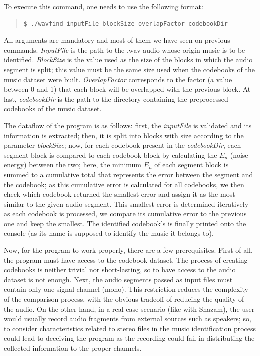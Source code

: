 \documentclass[12pt]{article}
\begin{document}
To execute this command, one needs to use the following format:

\begingroup
\addtolength\leftmargini{-0.4in}
\begin{quote}
\begin{verbatim}
$ ./wavfind inputFile blockSize overlapFactor codebookDir
\end{verbatim}
\end{quote}
\endgroup

All arguments are mandatory and most of them we have seen on previous commands. 
{\it InputFile\/} is the path to the .wav audio whose origin music is to be identified.
{\it BlockSize\/} is the value used as the size of the blocks in which the audio 
segment is split; this value must be the same size used when the codebooks of 
the music dataset were built.
{\it OverlapFactor\/} corresponds to the factor (a value between 0 and 1) that 
each block will be overlapped with the previous block.
At last, {\it codebookDir\/} is the path to the directory containing the 
preprocessed codebooks of the music dataset.

The dataflow of the program is as follows:
first, the {\it inputFile\/} is validated and its information is extracted; 
then, it is split into blocks with size according to the parameter {\it blockSize\/}; 
now, for each codebook present in the {\it codebookDir\/}, each segment block 
is compared to each codebook block by calculating the $E_n$ (noise energy) 
between the two;
here, the minimum $E_n$ of each segment block is summed to a cumulative total
that represents the error between the segment and the codebook;
as this cumulative error is calculated for all codebooks, we then check which 
codebook returned the smallest error and assign it as the most similar to the
given audio segment.
This smallest error is determined iteratively - as each codebook is processed, 
we compare its cumulative error to the previous one and keep the smallest.
The identified codebook's is finally printed onto the console (as its name is 
supposed to identify the music it belongs to).

Now, for the program to work properly, there are a few prerequisites.
First of all, the program must have access to the codebook dataset.
The process of creating codebooks is neither trivial nor short-lasting, so to 
have access to the audio dataset is not enough.
Next, the audio segments passed as input files must contain only one signal 
channel (mono).
This restriction reduces the complexity of the comparison process, with the
obvious tradeoff of reducing the quality of the audio.
On the other hand, in a real case scenario (like with Shazam), the user would
usually record audio fragments from external sources such as speakers; so, to 
consider characteristics related to stereo files in the music identification 
process could lead to deceiving the program as the recording could fail in 
distributing the collected information to the proper channels.
\end{document}
